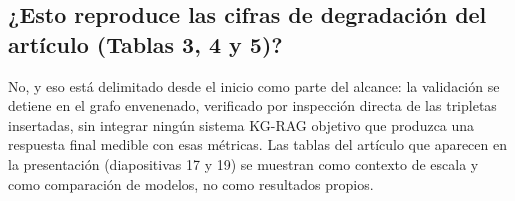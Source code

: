 \documentclass[11pt]{article}
\begin{document}
\subsection*{¿Esto reproduce las cifras de degradación del artículo (Tablas 3, 4 y 5)?}
No, y eso está delimitado desde el inicio como parte del alcance: la validación se detiene
en el grafo envenenado, verificado por inspección directa de las tripletas insertadas, sin
integrar ningún sistema KG-RAG objetivo que produzca una respuesta final medible con esas
métricas. Las tablas del artículo que aparecen en la presentación (diapositivas 17 y 19) se
muestran como contexto de escala y como comparación de modelos, no como resultados propios.
\end{document}
